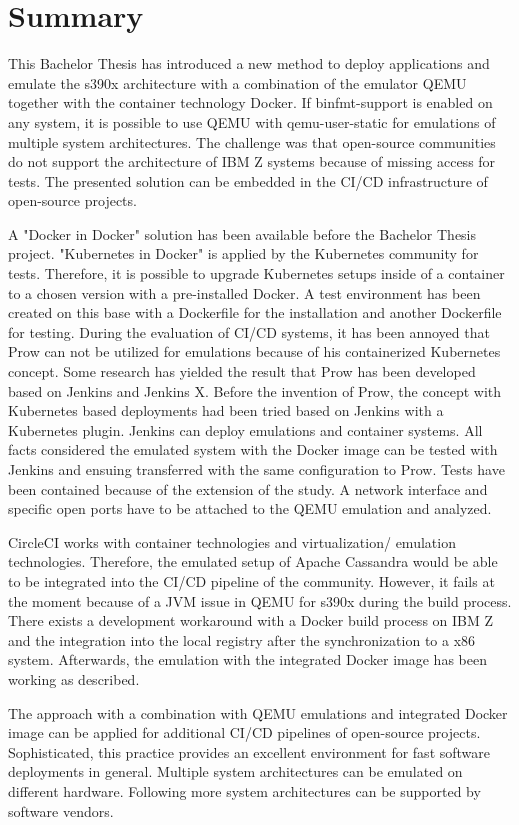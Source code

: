 \chapter{Summary}\label{ch:summary}

This Bachelor Thesis has introduced a new method to deploy applications and emulate the s390x architecture with a combination of the emulator \gls{QEMU} together with the container technology Docker.
If binfmt-support is enabled on any system, it is possible to use \gls{QEMU} with qemu-user-static for emulations of multiple system architectures. 
The challenge was that open-source communities do not support the architecture of IBM Z systems because of missing access for tests. The presented solution can be embedded in the \gls{CI/CD} infrastructure of open-source projects. 

A "Docker in Docker" solution has been available before the Bachelor Thesis project. "Kubernetes in Docker" is applied by the Kubernetes community for tests. 
Therefore, it is possible to upgrade Kubernetes setups inside of a container to a chosen version with a pre-installed Docker. A test environment has been created on this base with a Dockerfile for the installation and another Dockerfile for testing. During the evaluation of \gls{CI/CD} systems, it has been annoyed that Prow can not be utilized for emulations because of his containerized Kubernetes concept. 
Some research has yielded the result that Prow has been developed based on Jenkins and Jenkins X. Before the invention of Prow, the concept with Kubernetes based deployments had been  tried based on Jenkins with a Kubernetes plugin. Jenkins can deploy emulations and container systems. 
All facts considered the emulated system with the Docker image can be tested with Jenkins and ensuing transferred with the same configuration to Prow.
Tests have been contained because of the extension of the study. A network interface and specific open ports have to be attached to the \gls{QEMU} emulation and analyzed. 

CircleCI works with container technologies and virtualization/ emulation technologies. 
Therefore, the emulated setup of Apache Cassandra would be able to be integrated into the \gls{CI/CD} pipeline of the community. However, it fails at the moment because of a JVM issue in \gls{QEMU} for s390x during the build process. 
There exists a development workaround with a Docker build process on IBM Z and the integration into the local registry after the synchronization to a x86 system. Afterwards, the emulation with the integrated Docker image has been working as described.

The approach with a combination with \gls{QEMU} emulations and integrated Docker image can be applied for additional \gls{CI/CD} pipelines of open-source projects. Sophisticated, this practice provides an excellent environment for fast software deployments in general. 
Multiple system architectures can be emulated on different hardware. Following more system architectures can be supported by software vendors.